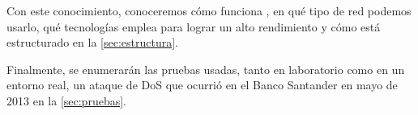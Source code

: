 Con este conocimiento, conoceremos cómo funciona 
\redborderddos{}, en qué tipo de red podemos usarlo, qué
tecnologías emplea para lograr un alto rendimiento y cómo está
estructurado en la \autoref{sec:estructura}.

Finalmente, se enumerarán las pruebas usadas, tanto en
laboratorio como en un entorno real, un ataque de \gls{DoS}
que ocurrió en el Banco Santander en mayo de 2013 en la
\autoref{sec:pruebas}.





\endinput
